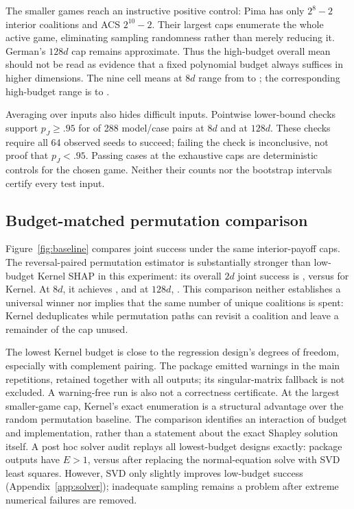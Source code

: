 The smaller games reach an instructive positive control: Pima has only $2^8-2$ interior coalitions and ACS $2^{10}-2$. Their largest caps enumerate the whole active game, eliminating sampling randomness rather than merely reducing it. German's $128d$ cap remains approximate. Thus the high-budget overall mean should not be read as evidence that a fixed polynomial budget always suffices in higher dimensions. The nine cell means at $8d$ range from \CellMinMedium{} to \CellMaxMedium{}; the corresponding high-budget range is \CellMinHigh{} to \CellMaxHigh{}.

Averaging over inputs also hides difficult inputs. Pointwise lower-bound checks support $p_J\geq .95$ for \CertifiedMedium{} of 288 model/case pairs at $8d$ and \CertifiedHigh{} at $128d$. These checks require all 64 observed seeds to succeed; failing the check is inconclusive, not proof that $p_J<.95$. Passing cases at the exhaustive caps are deterministic controls for the chosen game. Neither their counts nor the bootstrap intervals certify every test input.

\subsection{Budget-matched permutation comparison}
\label{sec:baseline}
Figure~\ref{fig:baseline} compares joint success under the same interior-payoff caps. The reversal-paired permutation estimator is substantially stronger than low-budget Kernel SHAP in this experiment: its overall $2d$ joint success is \PermLowJoint{}, versus \KernelLowJoint{} for Kernel. At $8d$, it achieves \PermMediumJoint{}, and at $128d$, \PermHighJoint{}. This comparison neither establishes a universal winner nor implies that the same number of unique coalitions is spent: Kernel deduplicates while permutation paths can revisit a coalition and leave a remainder of the cap unused.

The lowest Kernel budget is close to the regression design's degrees of freedom, especially with complement pairing. The package emitted \WarningCount{} warnings in the main repetitions, retained together with all outputs; its singular-matrix fallback is not excluded. A warning-free run is also not a correctness certificate. At the largest smaller-game cap, Kernel's exact enumeration is a structural advantage over the random permutation baseline. The comparison identifies an interaction of budget and implementation, rather than a statement about the exact Shapley solution itself. A post hoc solver audit replays all \SolverRuns{} lowest-budget designs exactly: \ExtremePackage{} package outputs have $E>1$, versus \ExtremeSvd{} after replacing the normal-equation solve with SVD least squares. However, SVD only slightly improves low-budget success (Appendix~\ref{app:solver}); inadequate sampling remains a problem after extreme numerical failures are removed.

